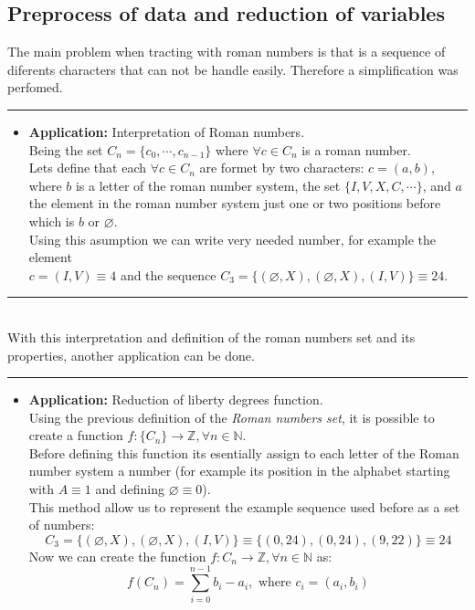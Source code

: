 \documentclass[a4paper, 11pt]{article}
\begin{document}
\subsection{Preprocess of data and reduction of variables}
The main problem when tracting with roman numbers is that is a sequence of diferents characters that can not be handle easily. Therefore a simplification was perfomed.\\
\rule{\linewidth}{0.4pt}
    \begin{itemize}
        \item \textbf{Application:} Interpretation of Roman numbers.\\
        Being the set $C_n = \{c_0, \cdots, c_{n-1} \}$ where $\forall c \in C_n$ is a roman number.\\ 
        Lets define that each $\forall c \in C_n$ are formet by two characters: $c = (a,b)$, where $b$ is a letter of the roman number system, the set $\{I, V, X, C, \cdots \}$, and $a$ the element in the roman number system just one or two positions before which is $b$ or $\varnothing$.\\
        Using this asumption we can write very needed number, for example the element\\
        $c = (I,V) \equiv 4$ and the sequence $C_3 = \{ (\varnothing, X), (\varnothing, X), (I,V) \} \equiv 24$.
    \end{itemize}
\rule{\linewidth}{0.4pt}\\
With this interpretation and definition of the roman numbers set and its properties, another application can be done.
\newpage
\hspace{-1.3em}\rule{\linewidth}{0.4pt}
    \begin{itemize}
        \item \textbf{Application:} Reduction of liberty degrees function.\\
        Using the previous definition of the \textit{Roman numbers set}, it is possible to create a function $f:\{C_n\}\rightarrow \mathbb{Z}, \forall n \in \mathbb{N}$.\\
        Before defining this function its esentially assign to each letter of the Roman number system a number (for example its position in the alphabet starting with $A\equiv1$ and defining $\varnothing \equiv 0$).\\
        This method allow us to represent the example sequence used before as a set of numbers: 
        $$C_3 = \{ (\varnothing, X), (\varnothing, X), (I,V) \} \equiv \{ (0,24), (0,24), (9,22) \} \equiv 24$$
        Now we can create the function $f:C_n\rightarrow \mathbb{Z}, \forall n \in \mathbb{N}$ as:
        $$ f(C_n) = \sum_{i = 0}^{n-1} b_i-a_i, \text{ where } c_i = (a_i, b_i) $$
    \end{itemize}
\end{document}
